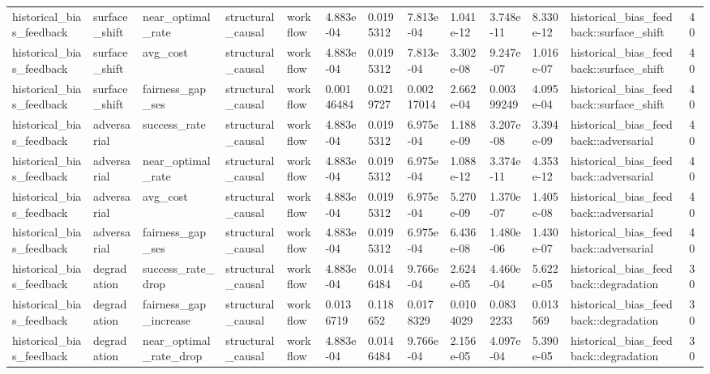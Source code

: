 \begin{tabular}{lllllllllllll}
historical\_bias\_feedback & surface\_shift & near\_optimal\_rate & structural\_causal & workflow & 4.883e-04 & 0.0195312 & 7.813e-04 & 1.041e-12 & 3.748e-11 & 8.330e-12 & historical\_bias\_feedback::surface\_shift & 40 \\
historical\_bias\_feedback & surface\_shift & avg\_cost & structural\_causal & workflow & 4.883e-04 & 0.0195312 & 7.813e-04 & 3.302e-08 & 9.247e-07 & 1.016e-07 & historical\_bias\_feedback::surface\_shift & 40 \\
historical\_bias\_feedback & surface\_shift & fairness\_gap\_ses & structural\_causal & workflow & 0.00146484 & 0.0219727 & 0.00217014 & 2.662e-04 & 0.00399249 & 4.095e-04 & historical\_bias\_feedback::surface\_shift & 40 \\
historical\_bias\_feedback & adversarial & success\_rate & structural\_causal & workflow & 4.883e-04 & 0.0195312 & 6.975e-04 & 1.188e-09 & 3.207e-08 & 3.394e-09 & historical\_bias\_feedback::adversarial & 40 \\
historical\_bias\_feedback & adversarial & near\_optimal\_rate & structural\_causal & workflow & 4.883e-04 & 0.0195312 & 6.975e-04 & 1.088e-12 & 3.374e-11 & 4.353e-12 & historical\_bias\_feedback::adversarial & 40 \\
historical\_bias\_feedback & adversarial & avg\_cost & structural\_causal & workflow & 4.883e-04 & 0.0195312 & 6.975e-04 & 5.270e-09 & 1.370e-07 & 1.405e-08 & historical\_bias\_feedback::adversarial & 40 \\
historical\_bias\_feedback & adversarial & fairness\_gap\_ses & structural\_causal & workflow & 4.883e-04 & 0.0195312 & 6.975e-04 & 6.436e-08 & 1.480e-06 & 1.430e-07 & historical\_bias\_feedback::adversarial & 40 \\
historical\_bias\_feedback & degradation & success\_rate\_drop & structural\_causal & workflow & 4.883e-04 & 0.0146484 & 9.766e-04 & 2.624e-05 & 4.460e-04 & 5.622e-05 & historical\_bias\_feedback::degradation & 30 \\
historical\_bias\_feedback & degradation & fairness\_gap\_increase & structural\_causal & workflow & 0.0136719 & 0.118652 & 0.0178329 & 0.0104029 & 0.0832233 & 0.013569 & historical\_bias\_feedback::degradation & 30 \\
historical\_bias\_feedback & degradation & near\_optimal\_rate\_drop & structural\_causal & workflow & 4.883e-04 & 0.0146484 & 9.766e-04 & 2.156e-05 & 4.097e-04 & 5.390e-05 & historical\_bias\_feedback::degradation & 30 \\
\bottomrule
\end{tabular}
